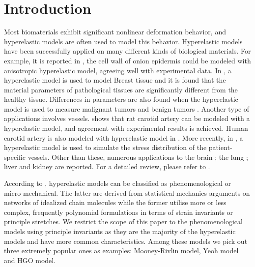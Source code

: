 \section{Introduction}
Most biomaterials exhibit significant nonlinear deformation behavior, and hyperelastic models are often used to model this behavior. Hyperelastic models have been successfully applied on many different kinds of biological materials. For example, it is reported in \cite{Qian}, the cell wall of onion epidermis could be modeled with anisotropic hyperelastic model, agreeing well with experimental data. In  \cite{OHagen}, a hyperelastic model is used to model Breast tissue and it is found that the material parameters of pathological tissues are significantly different from the healthy tissue. Differences in parameters are also found when the hyperelastic model is used to measure malignant tumors and benign tumors \cite{Oberai}. Another type of applications involves vessels. \cite{Zidi} shows that rat carotid artery can be modeled with a hyperelastic model, and agreement with experimental results is achieved. Human carotid artery is also modeled with hyperelastic model in \cite{Zidi2}. More recently, in \cite{Bols}, a hyperelastic model is used to simulate the stress distribution of the patient-specific vessels.
Other than these, numerous applications to the brain \cite{Karimi, Samani, Gilchrist}; the lung \cite{Wall, Wall2}; liver and kidney \cite{Fu, Untaroiu, Willinger} are reported. For a detailed review, please refer to \cite{Kupriyanova}.

According to \cite{Steinmann}, hyperelastic models can be classified as phenomenological or micro-mechanical. The latter are derived from statistical mechanics arguments on networks of idealized chain molecules while the former utilise more or less complex, frequently polynomial formulations in terms of strain invariants or principle stretches. We restrict the scope of this paper to the phenomenological models using principle invariants as they are the majority of the hyperelastic models and have more common characteristics. Among these models we pick out three extremely popular ones as examples: Mooney-Rivlin model, Yeoh model and HGO model.

